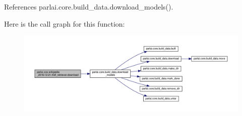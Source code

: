 References parlai.\+core.\+build\+\_\+data.\+download\+\_\+models().

Here is the call graph for this function\+:
\nopagebreak
\begin{figure}[H]
\begin{center}
\leavevmode
\includegraphics[width=350pt]{namespaceparlai_1_1zoo_1_1wikipedia__2016-12-21_1_1tfidf__retriever_ab7d8c33868c4641072b81d1d66602748_cgraph}
\end{center}
\end{figure}
